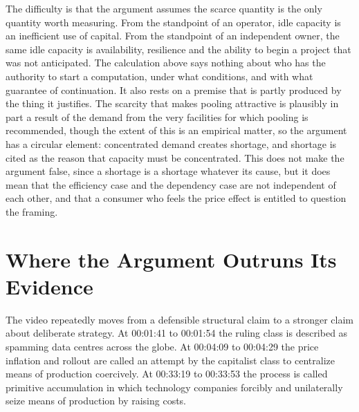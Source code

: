\documentclass[11pt]{article}
\theoremstyle{plain}
\theoremstyle{definition}
\begin{document}
The difficulty is that the argument assumes the scarce quantity is the only quantity worth measuring. From the standpoint of an operator, idle capacity is an inefficient use of capital. From the standpoint of an independent owner, the same idle capacity is availability, resilience and the ability to begin a project that was not anticipated. The calculation above says nothing about who has the authority to start a computation, under what conditions, and with what guarantee of continuation. It also rests on a premise that is partly produced by the thing it justifies. The scarcity that makes pooling attractive is plausibly in part a result of the demand from the very facilities for which pooling is recommended, though the extent of this is an empirical matter, so the argument has a circular element: concentrated demand creates shortage, and shortage is cited as the reason that capacity must be concentrated. This does not make the argument false, since a shortage is a shortage whatever its cause, but it does mean that the efficiency case and the dependency case are not independent of each other, and that a consumer who feels the price effect is entitled to question the framing.

\section{Where the Argument Outruns Its Evidence}

The video repeatedly moves from a defensible structural claim to a stronger claim about deliberate strategy. At 00:01:41 to 00:01:54 the ruling class is described as spamming data centres across the globe. At 00:04:09 to 00:04:29 the price inflation and rollout are called an attempt by the capitalist class to centralize means of production coercively. At 00:33:19 to 00:33:53 the process is called primitive accumulation in which technology companies forcibly and unilaterally seize means of production by raising costs.
\end{document}
